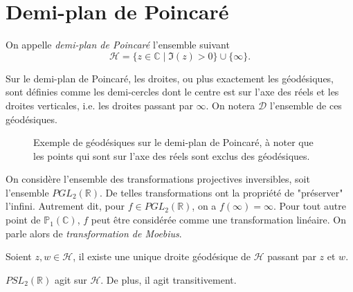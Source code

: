 \documentclass[..\main.tex]{subfiles}
\begin{document}
\section{Demi-plan de Poincaré}

\begin{definition}
    On appelle \emph{demi-plan de Poincaré} l'ensemble suivant
    \begin{equation}
        \mathcal{H} = \{ z \in \mathbb{C} \mid \Im(z) > 0 \}\cup \{\infty\}.
    \end{equation}
\end{definition}
Sur le demi-plan de Poincaré, les droites, ou plus exactement les géodésiques, 
sont définies comme les demi-cercles dont le centre est sur l'axe des réels et
les droites verticales, i.e. les droites passant par $\infty$. On notera \(\mathcal{D}\)
l'ensemble de ces géodésiques.
\begin{figure}
    \caption{Exemple de géodésiques sur le demi-plan de Poincaré, à noter que les points qui sont sur l'axe des réels sont exclus des géodésiques.}
\end{figure}
On considère l'ensemble des transformations projectives inversibles, soit l'ensemble \(PGL_2(\mathbb{R})\).
De telles transformations ont la propriété de "préserver" l'infini. Autrement dit, pour 
\(f \in PGL_2(\mathbb{R})\), on a \(f(\infty) = \infty\). Pour tout autre point de \(\mathbb{P}_1(\mathbb{C})\),
\(f\) peut être considérée comme une transformation linéaire. On parle alors de \emph{transformation de Moebius}.
\begin{lemma} Soient \(z,w\in \mathcal{H}\), il existe une unique droite géodésique de \(\mathcal{H}\) passant par \(z\) et \(w\).
\end{lemma}
\begin{proposition} \(PSL_2(\mathbb{R})\) agit sur \(\mathcal{H}\). De plus,
    il agit transitivement. 
\end{proposition}
\end{document}
